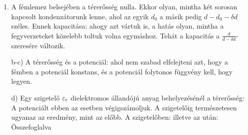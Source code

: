  \begin{enumerate}[label=\alph*),itemsep=0pt]
  \item 
   A fémlemez belsejében a térerősség nulla. Ekkor olyan, mintha két sorosan kapcsolt kondenzátorunk lenne, ahol az egyik $d_0$ a másik pedig $d-d_0-\delta d$ széles. Ennek kapacitása:
   ahogy azt vártuk is, a hatás olyan, mintha a fegyverzeteket közelebb toltuk volna egymáshoz. Tehát a kapacitás a $\frac{d}{d-\delta d}$-szeresére változik.
   
  \item[b-c)]
   A térerősség és a potenciál:
   ahol nem szabad elfelejteni azt, hogy a fémben a potenciál konstans, és a potenciál folytonos függvény kell, hogy legyen.
   
   \item[d)]
   Egy szigetelő $\varepsilon_\text{r}$ dielektromos állandójú anyag behelyezésénél a térerősség:
   A potenciált ebben az esetben végigszámoljuk. A szigetelőig természetesen ugyanaz az eredmény, mint az előbb. A szigetelőben:
   illetve az után:
   Összefoglalva
   

\end{enumerate}
